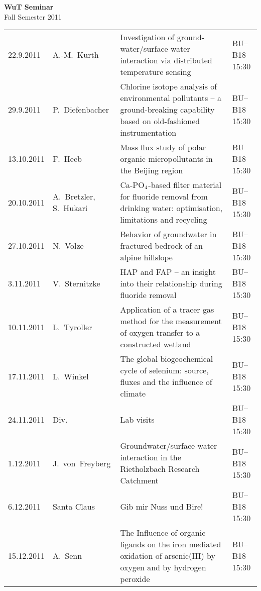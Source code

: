 \documentclass[12pt]{article}
\begin{document}
\centering

{\Huge \bf WuT Seminar}\\[1cm]
{\Large Fall Semester 2011}\\[1.8cm]

\large
\renewcommand*\arraystretch{1.4}
\begin{tabular}{l p{3.5cm} p{9.5cm} p{1.8cm}}

22.9.2011
	& A.-M.\ Kurth
	& Investigation of ground-water/surface-water interaction via distributed temperature sensing
	& BU--B18 15:30\\

29.9.2011
	& P.\ Diefenbacher
	& Chlorine isotope analysis of environmental pollutants -- a ground-breaking capability based on old-fashioned instrumentation
	& BU--B18 15:30\\


13.10.2011
	& F.\ Heeb
	& Mass flux study of polar organic micro\-pollutants in the Beijing region
	& BU--B18 15:30\\

20.10.2011
	& \mbox{A.~Bretzler}, S.~Hukari 
	& Ca-PO$_{\rm 4}$-based filter material for fluoride removal from drinking water: optimisation, limitations and recycling
	& BU--B18 15:30\\

27.10.2011
	& N.\ Volze
	& Behavior of groundwater in fractured bedrock of an alpine hillslope
	& BU--B18 15:30\\

3.11.2011
	& V.\ Sternitzke
	& HAP and FAP -- an insight into their relationship during fluoride removal 
	& BU--B18 15:30\\

10.11.2011
	& L.\ Tyroller
	& Application of a tracer gas method for the measurement of oxygen transfer to a constructed wetland
	& BU--B18 15:30\\

17.11.2011
	& L.\ Winkel
	& The global biogeochemical cycle of selenium: source, fluxes and the influence of climate
	& BU--B18 15:30\\

24.11.2011
	& Div.
	& Lab visits
	& BU--B18 15:30\\

1.12.2011
	& J.\ von~Freyberg
	& Groundwater/surface-water interaction in the Rietholzbach Research Catchment 
	& BU--B18 15:30\\

6.12.2011
	& Santa Claus
	& Gib mir Nuss und Bire!
	& BU--B18 15:30\\

15.12.2011
	& A.~Senn
	& The Influence of organic ligands on the iron mediated oxidation of arsenic(III) by oxygen and by hydrogen peroxide
	& BU--B18 15:30\\


\end{tabular}
\end{document}
